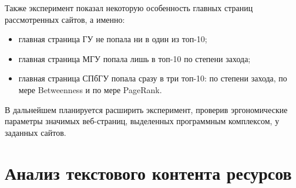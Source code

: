 Также эксперимент показал некоторую особенность главных страниц рассмотренных сайтов, а именно:
\begin{itemize}
	\item главная страница ГУ не попала ни в один из топ-10;
	\item главная страница МГУ попала лишь в топ-10 по степени захода;
	\item главная страница СПбГУ попала сразу в три топ-10: по степени захода, по мере Betweenness и по мере PageRank. 
\end{itemize}

В дальнейшем планируется расширить эксперимент, проверив эргономические параметры значимых веб-страниц, выделенных программным комплексом, у заданных сайтов. 

\section{Анализ текстового контента ресурсов}\label{sec:ch1/sec5}

\FloatBarrier
